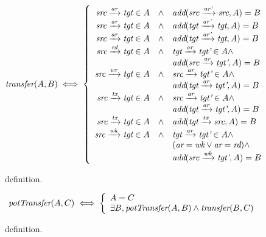 \begin{figure} 
  \[
  \FNtransfer{A}{B} \iff
  \left\{
  \begin{array}{rcl}
    \mkEdge{\ident{src}}{\ident{tgt}}{\ident{ar}} \in A & \wedge & \FNaddEq{\mkEdge{\ident{src}}{\ident{src}}{\ident{ar'}}}{A}{B}  \\
    \mkEdge{\ident{src}}{\ident{tgt}}{\ident{ar}} \in A & \wedge & \FNaddEq{\mkEdge{\ident{tgt}}{\ident{tgt}}{\ident{ar'}}}{A}{B}  \\
    \mkEdge{\ident{src}}{\ident{tgt}}{\ident{ar}} \in A & \wedge & \FNaddEq{\mkEdge{\ident{tgt}}{\ident{tgt}}{\ident{ar'}}}{A}{B}  \\
    \mkEdge{\ident{src}}{\ident{tgt}}{\NMrd} \in A & \wedge &  \mkEdge{\ident{tgt}}{\ident{tgt'}}{\ident{ar}} \in A  \wedge \\
    & & \FNaddEq{\mkEdge{\ident{src}}{\ident{tgt'}}{\ident{ar}}}{A}{B}  \\
    \mkEdge{\ident{src}}{\ident{tgt}}{\NMwr} \in A & \wedge & \mkEdge{\ident{src}}{\ident{tgt'}}{\ident{ar}} \in A  \wedge \\
    & & \FNaddEq{\mkEdge{\ident{tgt}}{\ident{tgt'}}{\ident{ar}}}{A}{B}  \\
    \mkEdge{\ident{src}}{\ident{tgt}}{\NMtx} \in A & \wedge &  \mkEdge{\ident{src}}{\ident{tgt'}}{\ident{ar}} \in A  \wedge\\
    & & \FNaddEq{\mkEdge{\ident{tgt}}{\ident{tgt'}}{\ident{ar}}}{A}{B}  \\
    \mkEdge{\ident{src}}{\ident{tgt}}{\NMtx} \in A & \wedge & \FNaddEq{\mkEdge{\ident{tgt}}{\ident{src}}{\NMtx}}{A}{B} \\
    \mkEdge{\ident{src}}{\ident{tgt}}{\NMwk} \in A & \wedge &  \mkEdge{\ident{tgt}}{\ident{tgt'}}{\ident{ar}} \in A  \wedge \\
    & & (\ident{ar} = \NMwk \vee \ident{ar} = \NMrd) \wedge \\
    & & \FNaddEq{\mkEdge{\ident{src}}{\ident{tgt'}}{\NMwk}}{A}{B}  \\
  \end{array}
  \right.
  \]
  \caption{\NMtransfer{} definition. \label{fig:sketch:trans}}
\end{figure}

\begin{figure}
  \[
  \FNpotTransfer{A}{C} \iff
  \left\{
  \begin{array}{l}
  A = C \\
  \exists B, \FNpotTransfer{A}{B} \wedge \FNtransfer{B}{C}
  \end{array}
  \right.
  \]
  \caption{\xmakefirstuc{\TMpotTransfer} definition. \label{fig:sketch:potTransfer}}
\end{figure}

